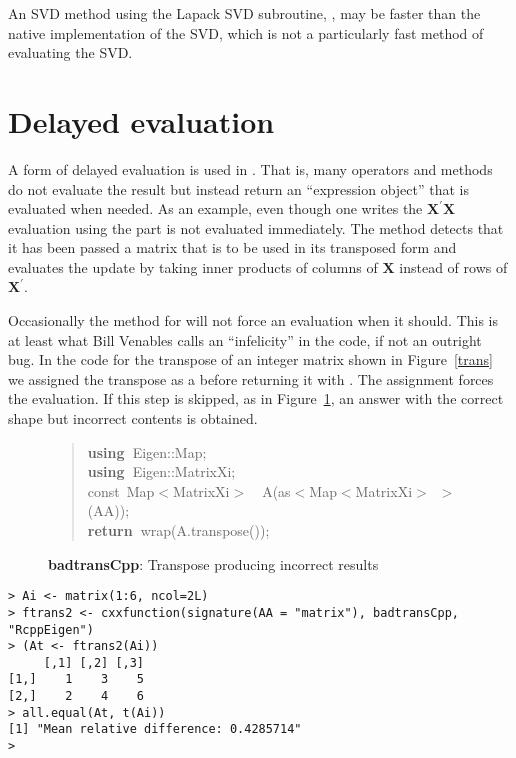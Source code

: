 \documentclass[shortnames,article]{jss}
\newcommand{\hlstd}[1]{\textcolor[rgb]{0,0,0}{#1}}
\newcommand{\hlopt}[1]{\textcolor[rgb]{0,0,0}{#1}}
\newcommand{\hlkwa}[1]{\textcolor[rgb]{0.61,0.13,0.93}{\bf{#1}}}
\newcommand{\hlkwb}[1]{\textcolor[rgb]{0.13,0.54,0.13}{#1}}
\newcommand{\hlkwd}[1]{\textcolor[rgb]{0,0,0}{#1}}
\begin{document}
An SVD method using the Lapack SVD subroutine, , may be
faster than the native  implementation of the SVD, which is
not a particularly fast method of evaluating the SVD.

\section{Delayed evaluation}
\label{sec:delayed}

A form of delayed evaluation is used in .  That is, many
operators and methods do not evaluate the result but instead return an
``expression object'' that is evaluated when needed.  As an example,
even though one writes the $\bm X^\prime\bm X$ evaluation using
 the  part is not
evaluated immediately.  The  method detects that it
has been passed a matrix that is to be used in its transposed form and
evaluates the update by taking inner products of columns of $\bm X$
instead of rows of $\bm X^\prime$.

Occasionally the method for  will not force an
evaluation when it should.  This is at least what Bill Venables calls
an ``infelicity'' in the code, if not an outright bug.  In the code
for the transpose of an integer matrix shown in Figure~\ref{trans} we
assigned the transpose as a  before returning it with
.  The assignment forces the evaluation.  If this
step is skipped, as in Figure~\ref{badtrans}, an answer with the correct
shape but incorrect contents is obtained.

\begin{figure}[htb]
  \begin{quote}
    \noindent
    \ttfamily
    \hlstd{}\hlkwa{using\ }\hlstd{Eigen}\hlopt{::}\hlstd{Map}\hlopt{;}\hspace*{\fill}\\
    \hlstd{}\hlkwa{using\ }\hlstd{Eigen}\hlopt{::}\hlstd{MatrixXi}\hlopt{;}\hspace*{\fill}\\
    \hlstd{}\hlkwb{const\ }\hlstd{Map}\hlopt{$<$}\hlstd{MatrixXi}\hlopt{$>$}\hlstd{\ \ }\hlopt{}\hlstd{}\hlkwd{A}\hlstd{}\hlopt{(}\hlstd{as}\hlopt{$<$}\hlstd{Map}\hlopt{$<$}\hlstd{MatrixXi}\hlopt{$>$\ $>$(}\hlstd{AA}\hlopt{));}\hspace*{\fill}\\
    \hlstd{}\hlkwa{return\ }\hlstd{}\hlkwd{wrap}\hlstd{}\hlopt{(}\hlstd{A}\hlopt{.}\hlstd{}\hlkwd{transpose}\hlstd{}\hlopt{());}\hlstd{}\hspace*{\fill}
    \normalfont
    \normalsize
  \end{quote}
  \caption{\textbf{badtransCpp}: Transpose producing incorrect results}
  \label{badtrans}
\end{figure}
\begin{verbatim}
> Ai <- matrix(1:6, ncol=2L)
> ftrans2 <- cxxfunction(signature(AA = "matrix"), badtransCpp, "RcppEigen")
> (At <- ftrans2(Ai))
     [,1] [,2] [,3]
[1,]    1    3    5
[2,]    2    4    6
> all.equal(At, t(Ai))
[1] "Mean relative difference: 0.4285714"
> 
\end{verbatim}
\end{document}
